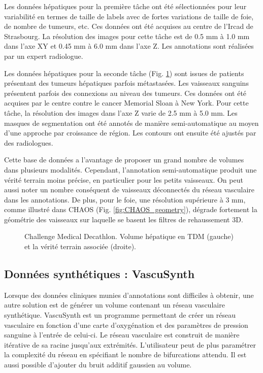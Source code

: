 Les données hépatiques pour la première tâche ont été sélectionnées pour leur variabilité en termes de taille de labels avec de fortes variations de taille de foie, de nombre de tumeurs, etc. Ces données ont été acquises au centre de l'Ircad de Strasbourg. La résolution des images pour cette tâche est de 0.5 mm à 1.0 mm dans l'axe XY et 0.45 mm à 6.0 mm dans l'axe Z. Les annotations sont réalisées par un expert radiologue.

Les données hépatiques pour la seconde tâche (Fig. \ref{fig:MD_examples}) sont issues de patients présentant des tumeurs hépatiques parfois métastasées. Les vaisseaux sanguins présentent parfois des connexions au niveau des tumeurs. Ces données ont été acquises par le centre contre le cancer Memorial Sloan à New York. Pour cette tâche, la résolution des images dans l'axe Z varie de 2.5 mm à 5.0 mm. Les masques de segmentation ont été annotés de manière semi-automatique au moyen d'une approche par croissance de région. Les contours ont ensuite été ajustés par des radiologues.

Cette base de données a l'avantage de proposer un grand nombre de volumes dans plusieurs modalités. Cependant, l'annotation semi-automatique produit une vérité terrain moins précise, en particulier pour les petits vaisseaux. On peut aussi noter un nombre conséquent de vaisseaux déconnectés du réseau vasculaire dans les annotations. De plus, pour le foie, une résolution supérieure à 3 mm, comme illustré dans CHAOS (Fig. \ref{fig:CHAOS_geometry}), dégrade fortement la géométrie des vaisseaux sur laquelle se basent les filtres de rehaussement 3D.

\begin{figure}
    \centering
    \caption{Challenge Medical Decathlon. Volume hépatique en TDM (gauche) et la vérité terrain associée (droite).}
    \label{fig:MD_examples}
\end{figure}

\subsection{Données synthétiques : VascuSynth}

Lorsque des données cliniques munies d'annotations sont difficiles à obtenir, une autre solution est de générer un volume contenant un réseau vasculaire synthétique. VascuSynth est un programme permettant de créer un réseau vasculaire en fonction d'une carte d'oxygénation et des paramètres de pression sanguine à l'entrée de celui-ci. Le réseau vasculaire est construit de manière itérative de sa racine jusqu'aux extrémités. L'utilisateur peut de plus paramétrer la complexité du réseau en spécifiant le nombre de bifurcations attendu. Il est aussi possible d'ajouter du bruit additif gaussien au volume.

